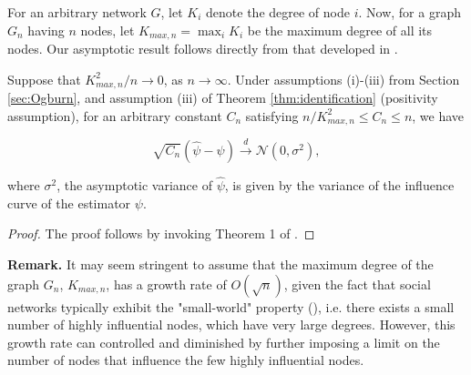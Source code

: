 \documentclass{article}
\begin{document}
For an arbitrary network $G$, let $K_i$ denote the degree of node $i$. Now, for a graph $G_n$ having $n$ nodes, let $K_{max, n} = \max_i{K_i}$ be the maximum degree of all its nodes. Our asymptotic result follows directly from that developed in \cite{Ogburn:Sofrygin:Diaz:vanderLaan:2017}. 

\begin{theorem}
Suppose that $K_{max, n}^2/n \to 0$, as $n  \to \infty$. Under assumptions (i)-(iii) from Section \ref{sec:Ogburn}, and assumption (iii) of Theorem \ref{thm:identification} (positivity assumption), for an arbitrary constant $C_n$ satisfying $n/K_{max, n}^2 \leq C_n \leq n$, we have 

$$\sqrt{C_n} (\hat{\psi} - \psi)  \xrightarrow[]{d} \mathcal{N}(0, \sigma^2), $$

\noindent where $\sigma^2$, the asymptotic variance of $\hat{\psi}$, is given by the variance of the influence curve of the estimator $\psi$. 
\end{theorem}


\begin{proof}
The proof follows by invoking Theorem 1 of \cite{Ogburn:Sofrygin:Diaz:vanderLaan:2017}. 
\end{proof}

\textbf{Remark.} It may seem stringent to assume that the maximum degree of the graph $G_n$,  $K_{max, n}$, has a growth rate of $O(\sqrt{n})$, given the fact that social networks typically exhibit the "small-world" property (\cite{Durrett:2006}), i.e. there exists a small number of highly influential nodes, which have very large degrees. However, this growth rate can controlled and diminished by further imposing a limit on the number of nodes that influence the few highly influential nodes. 


\printbibliography

\newpage
\appendix
\end{document}
